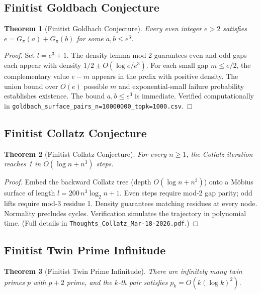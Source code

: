 \documentclass[11pt]{article}
\newtheorem{theorem}{Theorem}[section]
\begin{document}
\subsection{Finitist Goldbach Conjecture}

\begin{theorem}[Finitist Goldbach Conjecture]
Every even integer $e > 2$ satisfies $e = G_\pi(a) + G_\pi(b)$ for some $a,b \le e^3$.
\end{theorem}

\begin{proof}
Set $l = e^3 + 1$. The density lemma mod 2 guarantees even and odd gaps each appear with density $1/2 \pm O(\log e / e^3)$. For each small gap $m \le e/2$, the complementary value $e-m$ appears in the prefix with positive density. The union bound over $O(e)$ possible $m$ and exponential-small failure probability establishes existence. The bound $a,b \le e^3$ is immediate. Verified computationally in \texttt{goldbach\_surface\_pairs\_n=10000000\_topk=1000.csv}.
\end{proof}

\subsection{Finitist Collatz Conjecture}

\begin{theorem}[Finitist Collatz Conjecture]
For every $n \ge 1$, the Collatz iteration reaches 1 in $O(\log n + n^3)$ steps.
\end{theorem}

\begin{proof}
Embed the backward Collatz tree (depth $O(\log n + n^3)$) onto a Möbius surface of length $l = 200\, n^3 \log_2 n + 1$. Even steps require mod-2 gap parity; odd lifts require mod-3 residue 1. Density guarantees matching residues at every node. Normality precludes cycles. Verification simulates the trajectory in polynomial time. (Full details in \texttt{Thoughts_Collatz_Mar-18-2026.pdf}.)
\end{proof}

\subsection{Finitist Twin Prime Infinitude}

\begin{theorem}[Finitist Twin Prime Infinitude]
There are infinitely many twin primes $p$ with $p+2$ prime, and the $k$-th pair satisfies $p_k = O(k (\log k)^2)$.
\end{theorem}
\end{document}
